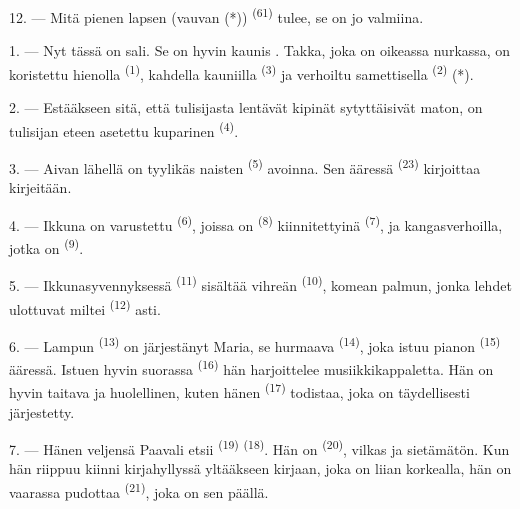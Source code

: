 12. --- Mitä pienen lapsen (vauvan (*)) 
\textsuperscript{(61)} tulee, se on jo valmiina.

\VUsaut{5.0mm}
\VUsaut{3.0mm}

1. --- Nyt tässä on sali. Se on hyvin kaunis . Takka, joka on
oikeassa nurkassa, on koristettu hienolla 
\textsuperscript{(1)}, kahdella kauniilla 
\textsuperscript{(3)} ja verhoiltu samettisella 
\textsuperscript{(2)} (*).

2. --- Estääkseen sitä, että tulisijasta lentävät kipinät sytyttäisivät maton, on
tulisijan eteen asetettu kuparinen  \textsuperscript{(4)}.

3. --- Aivan lähellä on tyylikäs naisten 
\textsuperscript{(5)} avoinna. Sen ääressä 
\textsuperscript{(23)} kirjoittaa kirjeitään.

4. --- Ikkuna on varustettu  \textsuperscript{(6)},
joissa on  \textsuperscript{(8)} kiinnitettyinä
 \textsuperscript{(7)}, ja kangasverhoilla, jotka on
 \textsuperscript{(9)}.

5. --- Ikkunasyvennyksessä  \textsuperscript{(11)} sisältää
vihreän  \textsuperscript{(10)}, komean palmun, jonka lehdet
ulottuvat miltei  \textsuperscript{(12)} asti.

6. --- Lampun  \textsuperscript{(13)} on järjestänyt Maria,
se hurmaava  \textsuperscript{(14)}, joka istuu pianon
\textsuperscript{(15)} ääressä. Istuen hyvin suorassa 
\textsuperscript{(16)} hän harjoittelee musiikkikappaletta. Hän on hyvin taitava
ja huolellinen, kuten hänen  \textsuperscript{(17)}
todistaa, joka on täydellisesti järjestetty.

\VUsaut{5.0mm}
\VUsaut{3.0mm}

7. --- Hänen veljensä Paavali etsii  \textsuperscript{(19)}
 \textsuperscript{(18)}. Hän on 
\textsuperscript{(20)}, vilkas ja sietämätön. Kun hän riippuu kiinni
kirjahyllyssä yltääkseen kirjaan, joka on liian korkealla, hän on vaarassa
pudottaa  \textsuperscript{(21)}, joka on sen päällä.

